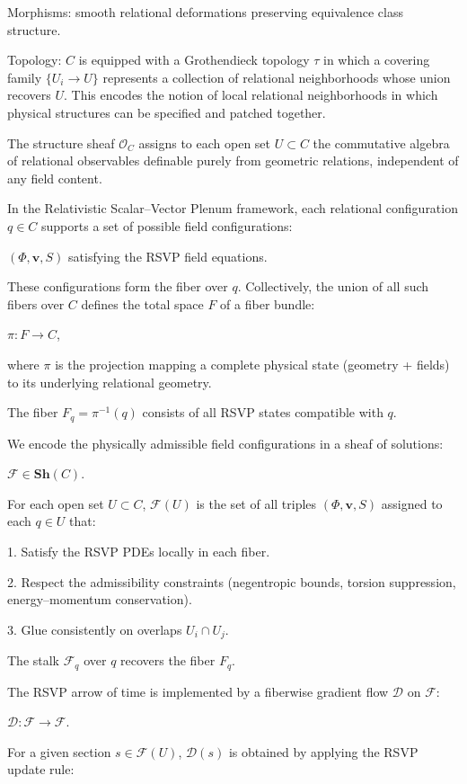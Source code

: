\documentclass[11pt]{article}
\theoremstyle{plain}
\theoremstyle{definition}
\begin{document}
Morphisms: smooth relational deformations preserving equivalence class structure.

Topology: $C$ is equipped with a Grothendieck topology $\tau$ in which a covering family $\{U_i \to U\}$ represents a collection of relational neighborhoods whose union recovers $U$. This encodes the notion of local relational neighborhoods in which physical structures can be specified and patched together.

The structure sheaf $\mathscr{O}_C$ assigns to each open set $U \subset C$ the commutative algebra of relational observables definable purely from geometric relations, independent of any field content.

In the Relativistic Scalar–Vector Plenum framework, each relational configuration $q \in C$ supports a set of possible field configurations:

$(\Phi, \mathbf{v}, S)$ satisfying the RSVP field equations.

These configurations form the fiber over $q$. Collectively, the union of all such fibers over $C$ defines the total space $F$ of a fiber bundle:

$\pi: F \to C$,

where $\pi$ is the projection mapping a complete physical state (geometry + fields) to its underlying relational geometry.

The fiber $F_q = \pi^{-1}(q)$ consists of all RSVP states compatible with $q$.

We encode the physically admissible field configurations in a sheaf of solutions:

$\mathscr{F} \in \mathbf{Sh}(C)$.

For each open set $U \subset C$, $\mathscr{F}(U)$ is the set of all triples $(\Phi, \mathbf{v}, S)$ assigned to each $q \in U$ that:

1. Satisfy the RSVP PDEs locally in each fiber.

2. Respect the admissibility constraints (negentropic bounds, torsion suppression, energy–momentum conservation).

3. Glue consistently on overlaps $U_i \cap U_j$.

The stalk $\mathscr{F}_q$ over $q$ recovers the fiber $F_q$.

The RSVP arrow of time is implemented by a fiberwise gradient flow $\mathcal{D}$ on $\mathscr{F}$:

$\mathcal{D} : \mathscr{F} \to \mathscr{F}$.

For a given section $s \in \mathscr{F}(U)$, $\mathcal{D}(s)$ is obtained by applying the RSVP update rule:
\end{document}
